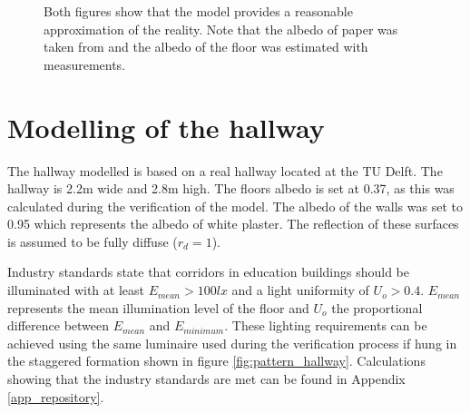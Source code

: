 \begin{figure}
	\centering     %
	\caption{Both figures show that the model provides a reasonable approximation of the reality. Note that the albedo of paper was taken from \cite{Albedo} and the albedo of the floor was estimated with measurements.\label{fig:VerificationResults}}
\end{figure}

\section{Modelling of the hallway}
\label{sec:moddelingofthehallway}
The hallway modelled is based on a real hallway located at the TU Delft. The hallway is 2.2m wide and 2.8m high. The floors albedo is set at 0.37, as this was calculated during the verification of the model. The albedo of the walls was set to 0.95 which represents the albedo of white plaster\cite{Albedo}. The reflection of these surfaces is assumed to be fully diffuse ($r_d = 1$).

Industry standards state that corridors in education buildings should be illuminated with at least $E_{mean} > 100lx$ and a light uniformity of $U_o > 0.4$\cite{lichthandbuch}. $E_{mean}$ represents the mean illumination level of the floor and $U_o$ the proportional difference between $E_{mean}$ and $E_{minimum}$. These lighting requirements can be achieved using the same luminaire used during the verification process if hung in the staggered formation shown in figure \ref{fig:pattern_hallway}. Calculations showing that the industry standards are met can be found in Appendix \ref{app_repository}.

